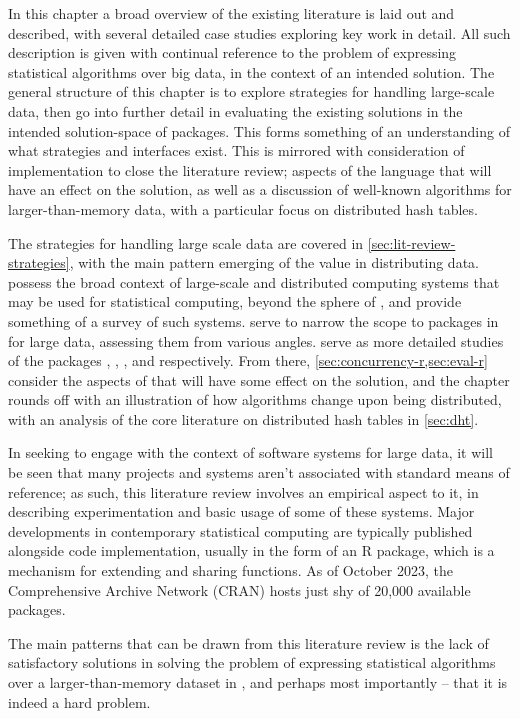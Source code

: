 In this chapter a broad overview of the existing literature is laid out and described, with several detailed case studies exploring key work in detail.
All such description is given with continual reference to the problem of expressing statistical algorithms over big data, in the context of an intended \lsr{} solution.
The general structure of this chapter is to explore strategies for handling large-scale data, then go into further detail in evaluating the existing solutions in the intended solution-space of \R{} packages.
This forms something of an understanding of what strategies and interfaces exist.
This is mirrored with consideration of implementation to close the literature review; aspects of the \R{} language that will have an effect on the solution, as well as a discussion of well-known algorithms for larger-than-memory data, with a particular focus on distributed hash tables.

The strategies for handling large scale data are covered in \cref{sec:lit-review-strategies}, with the main pattern emerging of the value in distributing data.
 possess the broad context of large-scale and distributed computing systems that may be used for statistical computing, beyond the sphere of \R{}, and provide something of a survey of such systems.
 serve to narrow the scope to packages in \R{} for large data, assessing them from various angles.
 serve as more detailed studies of the \R{} packages , , , and  respectively.
From there, \cref{sec:concurrency-r,sec:eval-r} consider the aspects of \R{} that will have some effect on the solution, and the chapter rounds off with an illustration of how algorithms change upon being distributed, with an analysis of the core literature on distributed hash tables in \cref{sec:dht}.

In seeking to engage with the context of software systems for large data, it will be seen that many projects and systems aren't associated with standard means of reference; as such, this literature review involves an empirical aspect to it, in describing experimentation and basic usage of some of these systems.
Major developments in contemporary statistical computing are typically
published alongside \R{} code implementation, usually in the form of an R
package, which is a mechanism for extending \R{} and sharing functions. As
of October 2023, the Comprehensive \R{} Archive Network (CRAN) hosts just shy of
20,000 available packages\cite{team20:_r}.

The main patterns that can be drawn from this literature review is the lack of satisfactory solutions in solving the problem of expressing statistical algorithms over a larger-than-memory dataset in \R{}, and perhaps most importantly -- that it is indeed a hard problem.
